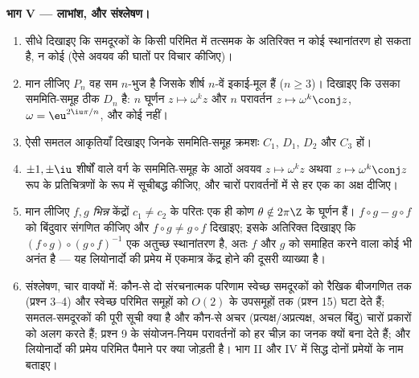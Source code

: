 \begin{problem}
\medskip \noindent\textbf{भाग V --- लाभांश, और संश्लेषण।}
\begin{enumerate}[resume]
  \item सीधे दिखाइए कि समदूरकों के किसी परिमित  में तत्समक के अतिरिक्त न
  कोई स्थानांतरण हो सकता है, न कोई  (ऐसे अवयव की घातों पर
  विचार कीजिए)।
  \item मान लीजिए $P_n$ वह सम $n$-भुज है जिसके शीर्ष $n$-वें इकाई-मूल हैं
  ($n \geq 3$)। दिखाइए कि उसका सममिति-समूह ठीक $D_n$ है: $n$ घूर्णन $z
  \mapsto \omega^k z$ और $n$ परावर्तन $z \mapsto \omega^k \conj z$, $\omega
  = \eu^{2\iu\pi/n}$, और कोई नहीं।
  \item ऐसी समतल आकृतियाँ दिखाइए जिनके सममिति-समूह क्रमशः $C_1$, $D_1$,
  $D_2$ और $C_3$ हों।
  \item $\pm1, \pm\iu$ शीर्षों वाले वर्ग के सममिति-समूह के आठों अवयव $z
  \mapsto \omega^k z$ अथवा $z \mapsto \omega^k\conj z$ रूप के प्रतिचित्रणों
  के रूप में सूचीबद्ध कीजिए, और चारों परावर्तनों में से हर एक का अक्ष दीजिए।
  \item मान लीजिए $f, g$ \emph{भिन्न} केंद्रों $c_1 \neq c_2$ के परितः एक ही
  कोण $\theta \notin 2\pi\Z$ के घूर्णन हैं। $f\circ g - g\circ f$ को
  बिंदुवार संगणित कीजिए और $f\circ g \neq g\circ f$ दिखाइए; इसके अतिरिक्त
  दिखाइए कि $(f \circ g)\circ(g\circ f)^{-1}$ एक अतुच्छ स्थानांतरण है, अतः
  $f$ और $g$ को समाहित करने वाला कोई भी  अनंत है --- यह लियोनार्दो की
  प्रमेय में एकमात्र केंद्र होने की दूसरी व्याख्या है।
  \item संश्लेषण, चार वाक्यों में: कौन-से दो संरचनात्मक परिणाम स्वेच्छ
  समदूरकों को रैखिक बीजगणित तक (प्रश्न 3--4) और स्वेच्छ परिमित समूहों को
  $O(2)$ के उपसमूहों तक (प्रश्न 15) घटा देते हैं; समतल-समदूरकों की पूरी सूची
  क्या है और कौन-से अचर (प्रत्यक्ष/अप्रत्यक्ष, अचल बिंदु) चारों प्रकारों को
  अलग करते हैं; प्रश्न 9 के संयोजन-नियम परावर्तनों को हर चीज़ का जनक क्यों
  बना देते हैं; और लियोनार्दो की प्रमेय परिमित पैमाने पर क्या जोड़ती है। भाग
  II और IV में सिद्ध दोनों प्रमेयों के नाम बताइए।
\end{enumerate}
\end{problem}
